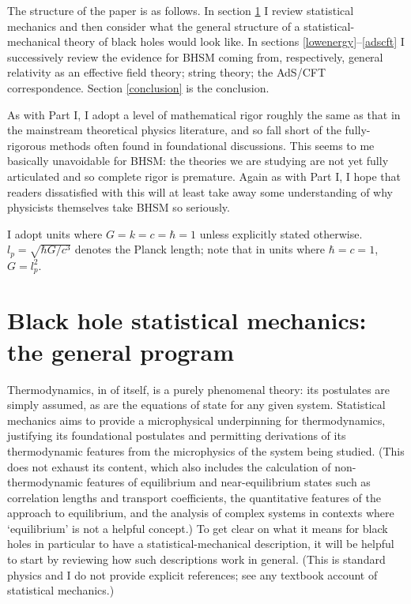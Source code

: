 \documentclass{article}
\begin{document}
The structure of the paper is as follows. In section \ref{generalprogram} I review statistical mechanics and then consider what the general structure of a statistical-mechanical theory of black holes would look like. In sections \ref{lowenergy}--\ref{adscft} I successively review the evidence for BHSM coming from, respectively, general relativity as an effective field theory; string theory; the AdS/CFT correspondence. Section \ref{conclusion} is the conclusion.

As with Part I, I adopt a level of mathematical rigor roughly the same as that in the mainstream theoretical physics literature, and so fall short of the fully-rigorous methods often found in foundational discussions. This seems to me basically unavoidable for BHSM: the theories we are studying are not yet fully articulated and so complete rigor is premature. Again as with Part I, I hope that readers dissatisfied with this will at least take away some understanding of why physicists themselves take BHSM so seriously. 

I adopt units where $G=k=c=\hbar=1$ unless explicitly stated otherwise. $l_p=\sqrt{\hbar G/c^3}$ denotes the Planck length; note that in units where $\hbar=c=1$, $G=l_p^2$.

\section{Black hole statistical mechanics: the general program}\label{generalprogram}


Thermodynamics, in of itself, is a purely phenomenal theory: its postulates are simply assumed, as are the equations of state for any given system. Statistical mechanics aims to provide a microphysical underpinning for thermodynamics, justifying its foundational postulates and permitting derivations of its thermodynamic features from the microphysics of the system being studied. (This does not exhaust its content, which also includes the calculation of  non-thermodynamic features of equilibrium and near-equilibrium states such as correlation lengths and transport coefficients, the quantitative features of the approach to equilibrium, and the analysis of complex systems in contexts where `equilibrium' is not a helpful concept.) To get clear on what it means for black holes in particular to have a statistical-mechanical description, it will be helpful to start by reviewing how such descriptions work in general. (This is standard physics and I do not provide explicit references; see any textbook account of statistical mechanics.)
\end{document}
